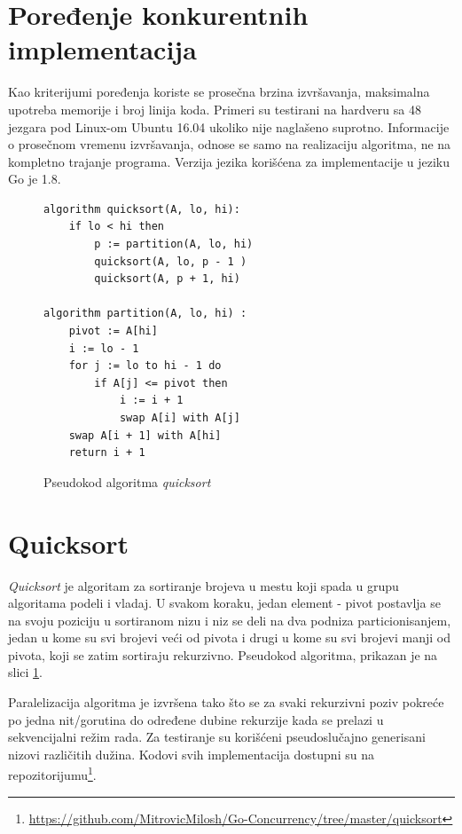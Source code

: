 \documentclass[12pt,oneside]{memoir}
\begin{document}
\section{Poređenje konkurentnih implementacija}
Kao kriterijumi poređenja koriste se prosečna brzina izvršavanja, maksimalna upotreba memorije i broj linija koda. Primeri su testirani na hardveru sa 48 jezgara pod Linux-om Ubuntu 16.04 ukoliko nije naglašeno suprotno. Informacije o prosečnom vremenu izvršavanja, odnose se samo na realizaciju algoritma, ne na kompletno trajanje programa. Verzija jezika korišćena za implementacije u jeziku Go je 1.8.

\begin{figure}
\begin{center}

\begin{Verbatim}[fontsize=\small]
algorithm quicksort(A, lo, hi):
    if lo < hi then
        p := partition(A, lo, hi)
        quicksort(A, lo, p - 1 )
        quicksort(A, p + 1, hi)

algorithm partition(A, lo, hi) :
    pivot := A[hi]
    i := lo - 1    
    for j := lo to hi - 1 do
        if A[j] <= pivot then
            i := i + 1
            swap A[i] with A[j]
    swap A[i + 1] with A[hi]
    return i + 1
\end{Verbatim}

\caption{Pseudokod algoritma \textit{quicksort}}
\label{fig:qs_pseudo}
\end{center}
\end{figure}

\section{Quicksort}
\textit{Quicksort} je algoritam za sortiranje brojeva u mestu koji spada u grupu algoritama podeli i vladaj. U svakom koraku, jedan element - pivot postavlja se na svoju poziciju u sortiranom nizu i niz se deli na dva podniza particionisanjem, jedan u kome su svi brojevi veći od pivota i drugi u kome su svi brojevi manji od pivota, koji se zatim sortiraju rekurzivno.  Pseudokod algoritma, prikazan je na slici \ref{fig:qs_pseudo}. 

Paralelizacija algoritma je izvršena tako što se za svaki rekurzivni poziv pokreće po jedna nit/gorutina do određene dubine rekurzije kada se prelazi u sekvencijalni režim rada. Za testiranje su korišćeni pseudoslučajno generisani nizovi različitih dužina. Kodovi svih implementacija dostupni su na repozitorijumu\footnote{\url{https://github.com/MitrovicMilosh/Go-Concurrency/tree/master/quicksort}}.
\end{document}
